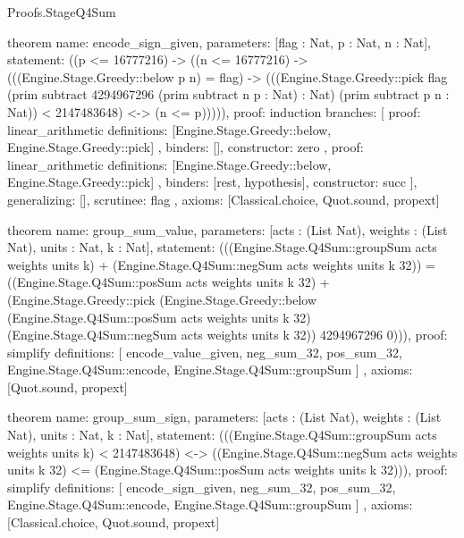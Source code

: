 \begin{lexlean}{Proofs.StageQ4Sum}
\begin{semanticmodule}
theorem{
  name: encode_sign_given,
  parameters: [flag : Nat, p : Nat, n : Nat],
  statement: ((p <= 16777216) -> ((n <= 16777216) -> (((Engine.Stage.Greedy::below p n) = flag) -> (((Engine.Stage.Greedy::pick flag (prim subtract 4294967296 (prim subtract n p : Nat) : Nat) (prim subtract p n : Nat)) < 2147483648) <-> (n <= p))))),
  proof: induction{
    branches: [
      {
        proof: linear_arithmetic{
          definitions: [Engine.Stage.Greedy::below, Engine.Stage.Greedy::pick]
        },
        binders: [],
        constructor: zero
      },
      {
        proof: linear_arithmetic{
          definitions: [Engine.Stage.Greedy::below, Engine.Stage.Greedy::pick]
        },
        binders: [rest, hypothesis],
        constructor: succ
      }
    ],
    generalizing: [],
    scrutinee: flag
  },
  axioms: [Classical.choice, Quot.sound, propext]
}

theorem{
  name: group_sum_value,
  parameters: [acts : (List Nat), weights : (List Nat), units : Nat, k : Nat],
  statement: (((Engine.Stage.Q4Sum::groupSum acts weights units k) + (Engine.Stage.Q4Sum::negSum acts weights units k 32)) = ((Engine.Stage.Q4Sum::posSum acts weights units k 32) + (Engine.Stage.Greedy::pick (Engine.Stage.Greedy::below (Engine.Stage.Q4Sum::posSum acts weights units k 32) (Engine.Stage.Q4Sum::negSum acts weights units k 32)) 4294967296 0))),
  proof: simplify{
    definitions: [
      encode_value_given,
      neg_sum_32,
      pos_sum_32,
      Engine.Stage.Q4Sum::encode,
      Engine.Stage.Q4Sum::groupSum
    ]
  },
  axioms: [Quot.sound, propext]
}

theorem{
  name: group_sum_sign,
  parameters: [acts : (List Nat), weights : (List Nat), units : Nat, k : Nat],
  statement: (((Engine.Stage.Q4Sum::groupSum acts weights units k) < 2147483648) <-> ((Engine.Stage.Q4Sum::negSum acts weights units k 32) <= (Engine.Stage.Q4Sum::posSum acts weights units k 32))),
  proof: simplify{
    definitions: [
      encode_sign_given,
      neg_sum_32,
      pos_sum_32,
      Engine.Stage.Q4Sum::encode,
      Engine.Stage.Q4Sum::groupSum
    ]
  },
  axioms: [Classical.choice, Quot.sound, propext]
}
\end{semanticmodule}
\end{lexlean}
